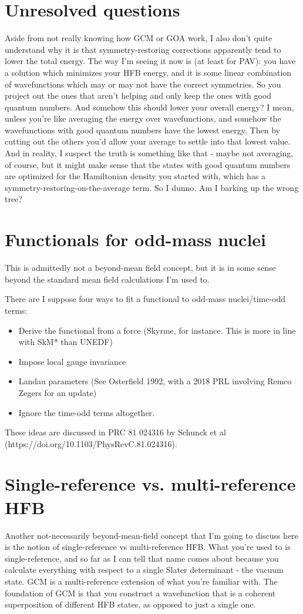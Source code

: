 \section*{Unresolved questions}
Aside from not really knowing how GCM or GOA work, I also don't quite understand why it is that symmetry-restoring corrections apparently tend to lower the total energy. The way I'm seeing it now is (at least for PAV): you have a solution which minimizes your HFB energy, and it is some linear combination of wavefunctions which may or may not have the correct symmetries. So you project out the ones that aren't helping and only keep the ones with good quantum numbers. And somehow this should lower your overall energy? I mean, unless you're like averaging the energy over wavefunctions, and somehow the wavefunctions with good quantum numbers have the lowest energy. Then by cutting out the others you'd allow your average to settle into that lowest value. And in reality, I suspect the truth is something like that - maybe not averaging, of course, but it might make sense that the states with good quantum numbers are optimized for the Hamiltonian density you started with, which has a symmetry-restoring-on-the-average term. So I dunno. Am I barking up the wrong tree?

\section*{Functionals for odd-mass nuclei}
This is admittedly not a beyond-mean field concept, but it is in some sense beyond the standard mean field calculations I'm used to.

There are I suppose four ways to fit a functional to odd-mass nuclei/time-odd terms:
\begin{itemize}
	\item Derive the functional from a force (Skyrme, for instance. This is more in line with SkM* than UNEDF)
	\item Impose local gauge invariance
	\item Landau parameters (See Osterfield 1992, with a 2018 PRL involving Remco Zegers for an update)
	\item Ignore the time-odd terms altogether.
\end{itemize}

These ideas are discussed in PRC 81 024316 by Schunck et al (https://doi.org/10.1103/PhysRevC.81.024316).

\section*{Single-reference vs. multi-reference HFB}
Another not-necessarily beyond-mean-field concept that I'm going to discuss here is the notion of single-reference vs multi-reference HFB. What you're used to is single-reference, and so far as I can tell that name comes about because you calculate everything with respect to a single Slater determinant - the vacuum state. GCM is a multi-reference extension of what you're familiar with. The foundation of GCM is that you construct a wavefunction that is a coherent superposition of different HFB states, as opposed to just a single one.

